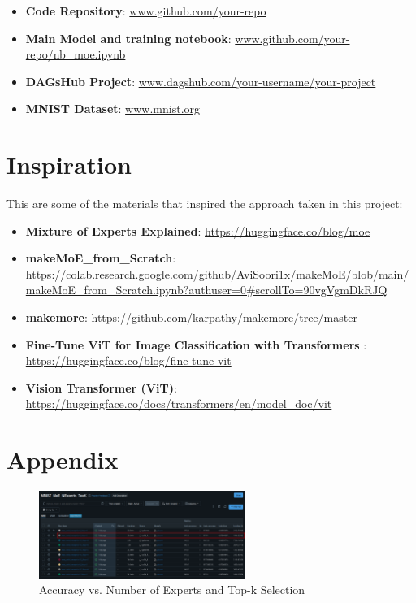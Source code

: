 \documentclass[a4paper,11pt]{article}
\begin{document}
\begin{itemize}
    \item \textbf{Code Repository}: \url{www.github.com/your-repo}
    \item \textbf{Main Model and training notebook}: \url{www.github.com/your-repo/nb_moe.ipynb}
    \item \textbf{DAGsHub Project}: \url{www.dagshub.com/your-username/your-project}
    \item \textbf{MNIST Dataset}: \url{www.mnist.org}
\end{itemize}


\section{Inspiration}

This are some of the materials that inspired the approach taken in this project:

\begin{itemize}

    \item \textbf{Mixture of Experts Explained}: \url{https://huggingface.co/blog/moe}
    \item \textbf{makeMoE_from_Scratch}: \url{https://colab.research.google.com/github/AviSoori1x/makeMoE/blob/main/makeMoE_from_Scratch.ipynb?authuser=0#scrollTo=90vgVgmDkRJQ}
    \item \textbf{makemore}: \url{https://github.com/karpathy/makemore/tree/master}
    \item \textbf{Fine-Tune ViT for Image Classification with Transformers }: \url{https://huggingface.co/blog/fine-tune-vit}
    \item \textbf{Vision Transformer (ViT)}: \url{https://huggingface.co/docs/transformers/en/model_doc/vit}
    
\end{itemize}


\section{Appendix}
\begin{figure}[H]
    \centering
    \includegraphics[width=0.6\textwidth]{images/experts_topk.png}
    \caption{Accuracy vs. Number of Experts and Top-k Selection}
\end{figure}
\end{document}

